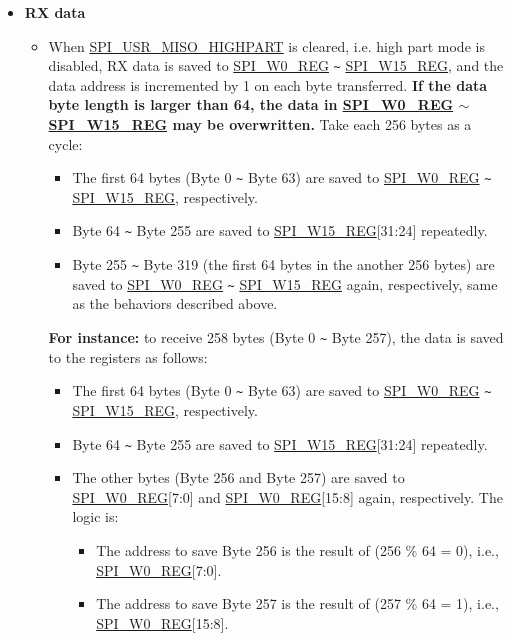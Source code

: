 \documentclass[main\_\_EN.tex]{subfiles}
\begin{document}
\begin{itemize}
    \item  \textbf{RX data}
    \begin{itemize}
        \item When \hyperref[fielddesc:SPIUSRMISOHIGHPART]{SPI\_USR\_MISO\_HIGHPART} is cleared, i.e. high part mode is disabled, RX data is saved to \hyperref[regdesc:SPIW0REG]{SPI\_W0\_REG} \verb+~+ \hyperref[regdesc:SPIW15REG]{SPI\_W15\_REG}, and the data address is incremented by 1 on each byte transferred. \textbf{If the data byte length is larger than 64, the data in \hyperref[regdesc:SPIW0REG]{SPI\_W0\_REG} $\sim$ \hyperref[regdesc:SPIW15REG]{SPI\_W15\_REG} may be overwritten.} Take each 256 bytes as a cycle:
        \begin{itemize}
            \item The first 64 bytes (Byte 0 \verb+~+ Byte 63) are saved to \hyperref[regdesc:SPIW0REG]{SPI\_W0\_REG} \verb+~+ \hyperref[regdesc:SPIW15REG]{SPI\_W15\_REG}, respectively.
            \item Byte 64 \verb+~+ Byte 255 are saved to \hyperref[regdesc:SPIW15REG]{SPI\_W15\_REG}[31:24] repeatedly.
            \item Byte 255 \verb+~+ Byte 319 (the first 64 bytes in the another 256 bytes) are saved to \hyperref[regdesc:SPIW0REG]{SPI\_W0\_REG} \verb+~+ \hyperref[regdesc:SPIW15REG]{SPI\_W15\_REG} again, respectively, same as the behaviors described above.
        \end{itemize}

        \textbf{For instance:} to receive 258 bytes (Byte 0 \verb+~+ Byte 257), the data is saved to the registers as follows:
        \begin{itemize}
            \item The first 64 bytes (Byte 0 \verb+~+ Byte 63) are saved to \hyperref[regdesc:SPIW0REG]{SPI\_W0\_REG} \verb+~+ \hyperref[regdesc:SPIW15REG]{SPI\_W15\_REG}, respectively.
            \item Byte 64 \verb+~+ Byte 255 are saved to \hyperref[regdesc:SPIW15REG]{SPI\_W15\_REG}[31:24] repeatedly.
            \item The other bytes (Byte 256 and Byte 257) are saved to \hyperref[regdesc:SPIW0REG]{SPI\_W0\_REG}[7:0] and \hyperref[regdesc:SPIW0REG]{SPI\_W0\_REG}[15:8] again, respectively. The logic is:
            \begin{itemize}
                \item The address to save Byte 256 is the result of (256 \% 64 = 0), i.e., \hyperref[regdesc:SPIW0REG]{SPI\_W0\_REG}[7:0].
                \item The address to save Byte 257 is the result of (257 \% 64 = 1), i.e., \hyperref[regdesc:SPIW0REG]{SPI\_W0\_REG}[15:8].
            \end{itemize}
        \end{itemize}


\end{itemize}
\end{itemize}
\end{document}
